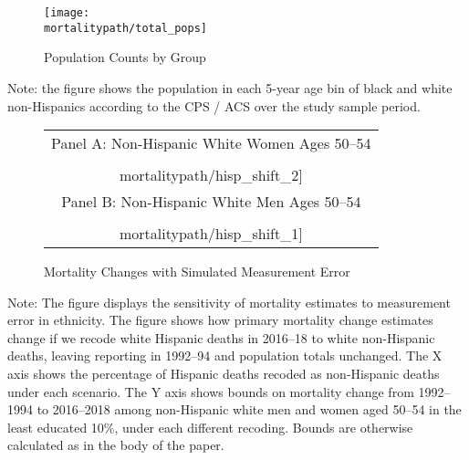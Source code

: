 \begin{figure}[H]
  \caption{Population Counts by Group}
  \label{fig:pops}
  \begin{center}
    \texttt{[image: \\mortalitypath/total\_pops]} \\
  \end{center}
\end{figure}
\scriptsize{Note: the figure shows the population in each 5-year age bin of black and white non-Hispanics according to the CPS / ACS over the study sample period.}

\begin{figure}[H]
  \caption{Mortality Changes with Simulated Measurement Error}
  \label{fig:hisp_changes}
  \begin{center}
    \begin{tabular}{c}
      \small{Panel A: Non-Hispanic White Women Ages 50--54} \\ \texttt{[image: \\mortalitypath/hisp\_shift\_2]} \\ \small{Panel B: Non-Hispanic White Men Ages 50--54} \\ \texttt{[image: \\mortalitypath/hisp\_shift\_1]}
    \end{tabular}
  \end{center}
\end{figure}
\scriptsize{Note: The figure displays the sensitivity of mortality estimates to measurement error in ethnicity. The figure shows how primary mortality change estimates change if we recode white Hispanic deaths in 2016--18 to white non-Hispanic deaths, leaving reporting in 1992--94 and population totals unchanged. The X axis shows the percentage of Hispanic deaths recoded as non-Hispanic deaths under each scenario. The Y axis shows bounds on mortality change from 1992--1994 to 2016--2018 among non-Hispanic white men and women aged 50--54 in the least educated 10\%, under each different recoding. Bounds are otherwise calculated as in the body of the paper.}
